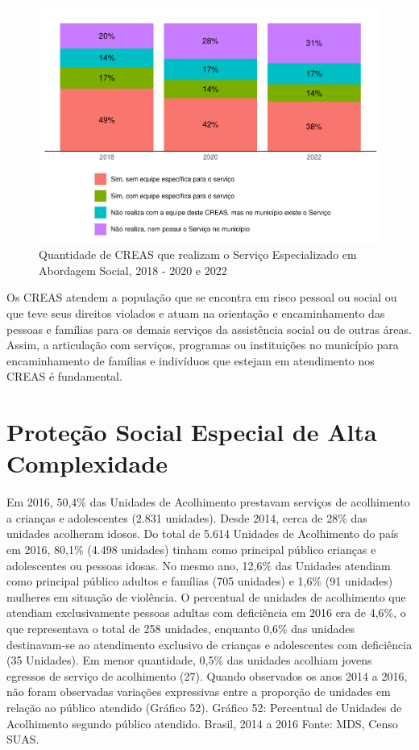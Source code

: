 \documentclass[
  brazilian]{report}
\begin{document}
\begin{figure}
\includegraphics{Censo-SUAS-2022_files/figure-latex/CREAS-abordagem-social-1} \caption[Quantidade de CREAS que realizam o Serviço Especializado em Abordagem Social, 2018 - 2020 e 2022]{Quantidade de CREAS que realizam o Serviço Especializado em Abordagem Social, 2018 - 2020 e 2022}\label{fig:CREAS-abordagem-social}
\end{figure}

Os CREAS atendem a população que se encontra em risco pessoal ou social
ou que teve seus direitos violados e atuam na orientação e
encaminhamento das pessoas e famílias para os demais serviços da
assistência social ou de outras áreas. Assim, a articulação com
serviços, programas ou instituições no município para encaminhamento de
famílias e indivíduos que estejam em atendimento nos CREAS é
fundamental.

\hypertarget{proteuxe7uxe3o-social-especial-de-alta-complexidade}{%
\section{Proteção Social Especial de Alta
Complexidade}\label{proteuxe7uxe3o-social-especial-de-alta-complexidade}}

Em 2016, 50,4\% das Unidades de Acolhimento prestavam serviços de
acolhimento a crianças e adolescentes (2.831 unidades). Desde 2014,
cerca de 28\% das unidades acolheram idosos. Do total de 5.614 Unidades
de Acolhimento do país em 2016, 80,1\% (4.498 unidades) tinham como
principal público crianças e adolescentes ou pessoas idosas. No mesmo
ano, 12,6\% das Unidades atendiam como principal público adultos e
famílias (705 unidades) e 1,6\% (91 unidades) mulheres em situação de
violência. O percentual de unidades de acolhimento que atendiam
exclusivamente pessoas adultas com deficiência em 2016 era de 4,6\%, o
que representava o total de 258 unidades, enquanto 0,6\% das unidades
destinavam-se ao atendimento exclusivo de crianças e adolescentes com
deficiência (35 Unidades). Em menor quantidade, 0,5\% das unidades
acolhiam jovens egressos de serviço de acolhimento (27). Quando
observados os anos 2014 a 2016, não foram observadas variações
expressivas entre a proporção de unidades em relação ao público atendido
(Gráfico 52). Gráfico 52: Percentual de Unidades de Acolhimento segundo
público atendido. Brasil, 2014 a 2016 Fonte: MDS, Censo SUAS.
\end{document}
